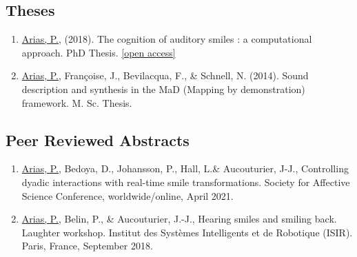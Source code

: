 \documentclass[a4paper, 11pt]{article}
\begin{document}
\subsection*{Theses}
\begin{enumerate}	
\item \ul{Arias, P.}, (2018). The cognition of auditory smiles : a computational approach. PhD Thesis. {\footnotesize \href{https://hal.archives-ouvertes.fr/tel-02010161/file/PhD%20Arias.pdf}{[open access]}}



\item \ul{Arias, P.}, Fran\c{c}oise, J., Bevilacqua, F., \& Schnell, N. (2014). Sound description and synthesis in the MaD (Mapping by demonstration) framework. M. Sc. Thesis.
\end{enumerate}

\subsection*{Peer Reviewed Abstracts}
\begin{enumerate}
	\item \ul{Arias, P.}, Bedoya, D., Johansson, P., Hall, L.\& Aucouturier, J-J., Controlling dyadic interactions with real-time smile transformations. Society for Affective Science Conference, worldwide/online, April 2021.
	\item \ul{Arias, P.}, Belin, P., \& Aucouturier, J.-J., Hearing smiles and smiling back. Laughter workshop. Institut des Systèmes Intelligents et de Robotique (ISIR). Paris, France, September 2018.
\end{enumerate}
\end{document}
